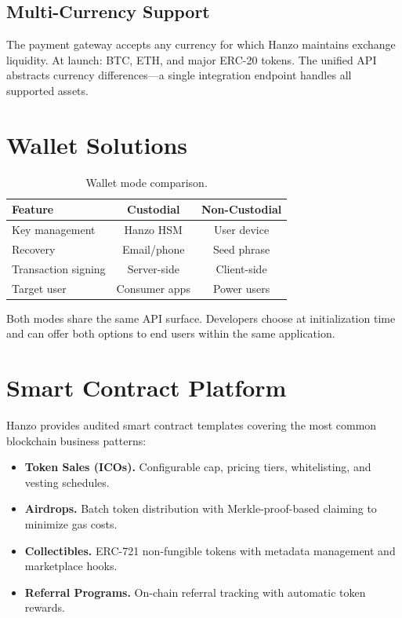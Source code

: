 \documentclass[11pt,twocolumn]{article}
\begin{document}
\subsection{Multi-Currency Support}

The payment gateway accepts any currency for which Hanzo maintains exchange
liquidity. At launch: BTC, ETH, and major ERC-20 tokens. The unified API
abstracts currency differences---a single integration endpoint handles all
supported assets.

\section{Wallet Solutions}
\label{sec:wallets}

\begin{table}[H]
\centering
\small
\begin{tabular}{lcc}
\toprule
\textbf{Feature} & \textbf{Custodial} & \textbf{Non-Custodial} \\
\midrule
Key management & Hanzo HSM & User device \\
Recovery & Email/phone & Seed phrase \\
Transaction signing & Server-side & Client-side \\
Target user & Consumer apps & Power users \\
\bottomrule
\end{tabular}
\caption{Wallet mode comparison.}
\label{tab:wallets}
\end{table}

Both modes share the same API surface. Developers choose at initialization time
and can offer both options to end users within the same application.

\section{Smart Contract Platform}
\label{sec:contracts}

Hanzo provides audited smart contract templates covering the most common
blockchain business patterns:

\begin{itemize}[leftmargin=1.1em]
    \item \textbf{Token Sales (ICOs).} Configurable cap, pricing tiers,
    whitelisting, and vesting schedules.
    \item \textbf{Airdrops.} Batch token distribution with Merkle-proof-based
    claiming to minimize gas costs.
    \item \textbf{Collectibles.} ERC-721 non-fungible tokens with metadata
    management and marketplace hooks.
    \item \textbf{Referral Programs.} On-chain referral tracking with automatic
    token rewards.
\end{itemize}
\end{document}
